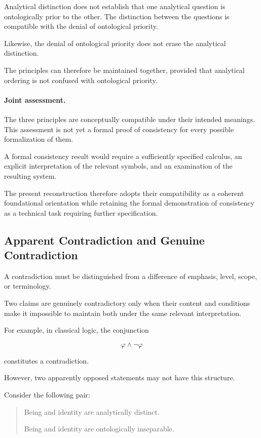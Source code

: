 Analytical distinction does not establish that one analytical
question is ontologically prior to the other. The distinction
between the questions is compatible with the denial of
ontological priority.

Likewise, the denial of ontological priority does not erase
the analytical distinction.

The principles can therefore be maintained together, provided
that analytical ordering is not confused with ontological
priority.

\paragraph{Joint assessment.}

The three principles are conceptually compatible under their
intended meanings. This assessment is not yet a formal proof
of consistency for every possible formalization of them.

A formal consistency result would require a sufficiently
specified calculus, an explicit interpretation of the
relevant symbols, and an examination of the resulting
system.

The present reconstruction therefore adopts their compatibility
as a coherent foundational orientation while retaining
the formal demonstration of consistency as a technical
task requiring further specification.

\subsection{Apparent Contradiction and Genuine Contradiction}

A contradiction must be distinguished from a difference
of emphasis, level, scope, or terminology.

Two claims are genuinely contradictory only when their
content and conditions make it impossible to maintain
both under the same relevant interpretation.

For example, in classical logic, the conjunction

\[
    \varphi \land \neg\varphi
\]

constitutes a contradiction.

However, two apparently opposed statements may not have
this structure.

Consider the following pair:

\begin{quote}
Being and identity are analytically distinct.

Being and identity are ontologically inseparable.
\end{quote}

